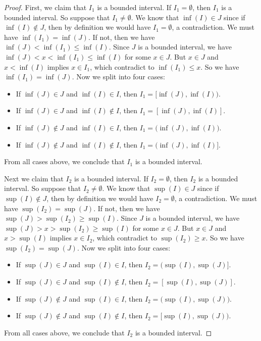 \begin{proof}
  First, we claim that \(I_1\) is a bounded interval.
  If \(I_1 = \emptyset\), then \(I_1\) is a bounded interval.
  So suppose that \(I_1 \neq \emptyset\).
  We know that \(\inf(I) \in J\) since if \(\inf(I) \notin J\), then by definition we would have \(I_1 = \emptyset\), a contradiction.
  We must have \(\inf(I_1) = \inf(J)\).
  If not, then we have \(\inf(J) < \inf(I_1) \leq \inf(I)\).
  Since \(J\) is a bounded interval, we have \(\inf(J) < x < \inf(I_1) \leq \inf(I)\) for some \(x \in J\).
  But \(x \in J\) and \(x < \inf(I)\) implies \(x \in I_1\), which contradict to \(\inf(I_1) \leq x\).
  So we have \(\inf(I_1) = \inf(J)\).
  Now we split into four cases:
  \begin{itemize}
    \item If \(\inf(J) \in J\) and \(\inf(I) \in I\), then \(I_1 = [\inf(J), \inf(I)\big)\).
    \item If \(\inf(J) \in J\) and \(\inf(I) \notin I\), then \(I_1 = [\inf(J), \inf(I)]\).
    \item If \(\inf(J) \notin J\) and \(\inf(I) \in I\), then \(I_1 = \big(\inf(J), \inf(I)\big)\).
    \item If \(\inf(J) \notin J\) and \(\inf(I) \notin I\), then \(I_1 = \big(\inf(J), \inf(I)]\).
  \end{itemize}
  From all cases above, we conclude that \(I_1\) is a bounded interval.

  Next we claim that \(I_2\) is a bounded interval.
  If \(I_2 = \emptyset\), then \(I_2\) is a bounded interval.
  So suppose that \(I_2 \neq \emptyset\).
  We know that \(\sup(I) \in J\) since if \(\sup(I) \notin J\), then by definition we would have \(I_2 = \emptyset\), a contradiction.
  We must have \(\sup(I_2) = \sup(J)\).
  If not, then we have \(\sup(J) > \sup(I_2) \geq \sup(I)\).
  Since \(J\) is a bounded interval, we have \(\sup(J) > x > \sup(I_2) \geq \sup(I)\) for some \(x \in J\).
  But \(x \in J\) and \(x > \sup(I)\) implies \(x \in I_2\), which contradict to \(\sup(I_2) \geq x\).
  So we have \(\sup(I_2) = \sup(J)\).
  Now we split into four cases:
  \begin{itemize}
    \item If \(\sup(J) \in J\) and \(\sup(I) \in I\), then \(I_2 = \big(\sup(I), \sup(J)]\).
    \item If \(\sup(J) \in J\) and \(\sup(I) \notin I\), then \(I_2 = [\sup(I), \sup(J)]\).
    \item If \(\sup(J) \notin J\) and \(\sup(I) \in I\), then \(I_2 = \big(\sup(I), \sup(J)\big)\).
    \item If \(\sup(J) \notin J\) and \(\sup(I) \notin I\), then \(I_2 = [\sup(I), \sup(J)\big)\).
  \end{itemize}
  From all cases above, we conclude that \(I_2\) is a bounded interval.


\end{proof}
